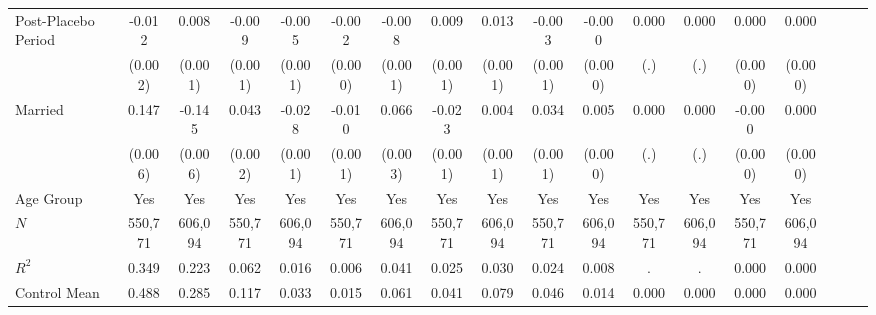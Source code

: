\documentclass[a4paper,12pt]{article}
\begin{document}
\begin{landscape}
\begin{table}[htbp]
{\begin{tabular}{@{}l*{17}{c}@{}}
\addlinespace
Post-Placebo Period&   -0.012\sym{***}&    0.008\sym{***}&   -0.009\sym{***}&   -0.005\sym{***}&   -0.002\sym{***}&   -0.008\sym{***}&    0.009\sym{***}&    0.013\sym{***}&   -0.003\sym{***}&   -0.000         &    0.000         &    0.000         &    0.000         &    0.000         \\
          &  (0.002)         &  (0.001)         &  (0.001)         &  (0.001)         &  (0.000)         &  (0.001)         &  (0.001)         &  (0.001)         &  (0.001)         &  (0.000)         &      (.)         &      (.)         &  (0.000)         &  (0.000)         \\
\addlinespace
Married   &    0.147\sym{***}&   -0.145\sym{***}&    0.043\sym{***}&   -0.028\sym{***}&   -0.010\sym{***}&    0.066\sym{***}&   -0.023\sym{***}&    0.004\sym{***}&    0.034\sym{***}&    0.005\sym{***}&    0.000         &    0.000         &   -0.000         &    0.000         \\
          &  (0.006)         &  (0.006)         &  (0.002)         &  (0.001)         &  (0.001)         &  (0.003)         &  (0.001)         &  (0.001)         &  (0.001)         &  (0.000)         &      (.)         &      (.)         &  (0.000)         &  (0.000)         \\
\addlinespace
Age Group &      Yes         &      Yes         &      Yes         &      Yes         &      Yes         &      Yes         &      Yes         &      Yes         &      Yes         &      Yes         &      Yes         &      Yes         &      Yes         &      Yes         \\
\midrule
$\textit{N}$&  550,771         &  606,094         &  550,771         &  606,094         &  550,771         &  606,094         &  550,771         &  606,094         &  550,771         &  606,094         &  550,771         &  606,094         &  550,771         &  606,094         \\
$\textit{R}^2$&    0.349         &    0.223         &    0.062         &    0.016         &    0.006         &    0.041         &    0.025         &    0.030         &    0.024         &    0.008         &        .         &        .         &    0.000         &    0.000         \\
Control Mean&    0.488         &    0.285         &    0.117         &    0.033         &    0.015         &    0.061         &    0.041         &    0.079         &    0.046         &    0.014         &    0.000         &    0.000         &    0.000         &    0.000         \\

\end{tabular}}
\end{table}
\end{landscape}
\end{document}
